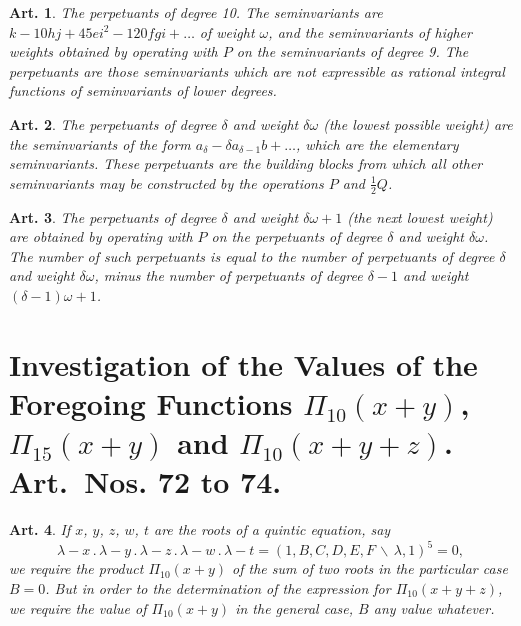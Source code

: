\documentclass[11pt,a4paper]{article}
\theoremstyle{cayley}
\newtheorem{art}{Art.}[section]
\begin{document}
\setcounter{art}{69}
\begin{art}
The perpetuants of degree 10. The seminvariants are $k - 10hj + 45ei^{2} - 120fgi + \ldots$ of weight $\omega$, and the seminvariants of higher weights obtained by operating with $P$ on the seminvariants of degree 9. The perpetuants are those seminvariants which are not expressible as rational integral functions of seminvariants of lower degrees.
\end{art}

\setcounter{art}{70}
\begin{art}
The perpetuants of degree $\delta$ and weight $\delta\omega$ (the lowest possible weight) are the seminvariants of the form $a_{\delta} - \delta a_{\delta - 1}b + \ldots$, which are the elementary seminvariants. These perpetuants are the building blocks from which all other seminvariants may be constructed by the operations $P$ and $\frac{1}{2}Q$.
\end{art}

\setcounter{art}{71}
\begin{art}
The perpetuants of degree $\delta$ and weight $\delta\omega + 1$ (the next lowest weight) are obtained by operating with $P$ on the perpetuants of degree $\delta$ and weight $\delta\omega$. The number of such perpetuants is equal to the number of perpetuants of degree $\delta$ and weight $\delta\omega$, minus the number of perpetuants of degree $\delta - 1$ and weight $(\delta - 1)\omega + 1$.
\end{art}

\section*{Investigation of the Values of the Foregoing Functions $\Pi_{10}(x + y)$, $\Pi_{15}(x + y)$ and $\Pi_{10}(x + y + z)$. Art.~Nos. \textbf{72} to \textbf{74}.}

\setcounter{art}{71}
\begin{art}
If $x$, $y$, $z$, $w$, $t$ are the roots of a quintic equation, say
\[
\lambda - x\,.\,\lambda - y\,.\,\lambda - z\,.\,\lambda - w\,.\,\lambda - t = (1, B, C, D, E, F\,\backslash\,\lambda, 1)^{5} = 0,
\]
we require the product $\Pi_{10}(x + y)$ of the sum of two roots in the particular case $B = 0$. But in order to the determination of the expression for $\Pi_{10}(x + y + z)$, we require the value of $\Pi_{10}(x + y)$ in the general case, $B$ any value whatever.
\end{art}
\end{document}

